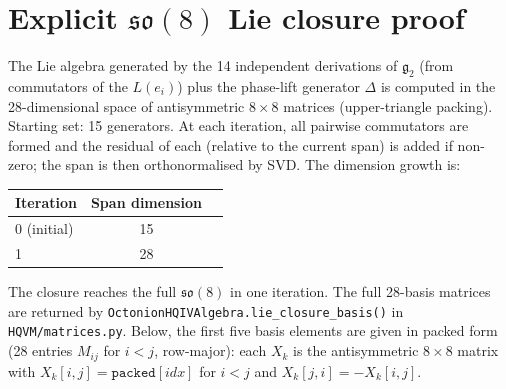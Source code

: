 \documentclass[12pt,a4paper]{article}
\begin{document}
\section{Explicit \texorpdfstring{\(\mathfrak{so}(8)\)}{so(8)} Lie closure proof}
\label{app:so8-closure}
The Lie algebra generated by the 14 independent derivations of \(\mathfrak{g}_2\) (from commutators of the \(L(e_i)\)) plus the phase-lift generator \(\Delta\) is computed in the 28-dimensional space of antisymmetric \(8\times 8\) matrices (upper-triangle packing). Starting set: 15 generators. At each iteration, all pairwise commutators are formed and the residual of each (relative to the current span) is added if non-zero; the span is then orthonormalised by SVD. The dimension growth is:
\begin{center}
\begin{tabular}{lcc}
\toprule
Iteration & Span dimension \\
\midrule
0 (initial) & 15 \\
1 & 28 \\
\bottomrule
\end{tabular}
\end{center}
The closure reaches the full \(\mathfrak{so}(8)\) in one iteration. The full 28-basis matrices are returned by \texttt{OctonionHQIVAlgebra.lie\_closure\_basis()} in \texttt{HQVM/matrices.py}. Below, the first five basis elements are given in packed form (28 entries \(M_{ij}\) for \(i<j\), row-major): each \(X_k\) is the antisymmetric \(8\times 8\) matrix with \(X_k[i,j] = \texttt{packed}[idx]\) for \(i<j\) and \(X_k[j,i] = -X_k[i,j]\).
\end{document}
